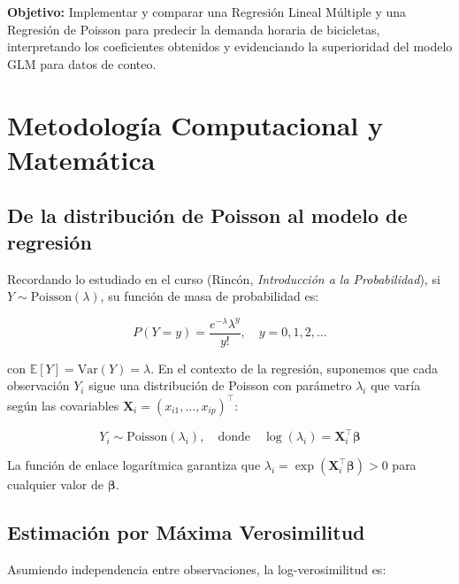 \documentclass[12pt, a4paper]{article}
\begin{document}
	\textbf{Objetivo:} Implementar y comparar una Regresi\'on Lineal M\'ultiple y una
	Regresi\'on de Poisson para predecir la demanda horaria de bicicletas, interpretando
	los coeficientes obtenidos y evidenciando la superioridad del modelo GLM para datos
	de conteo.
	
	\section{Metodolog\'ia Computacional y Matem\'atica}
	
	\subsection{De la distribuci\'on de Poisson al modelo de regresi\'on}
	
	Recordando lo estudiado en el curso (Rinc\'on, \textit{Introducci\'on a la
		Probabilidad}), si $Y \sim \text{Poisson}(\lambda)$, su funci\'on de masa de
	probabilidad es:
	
	\begin{equation}
		P(Y = y) = \frac{e^{-\lambda}\lambda^{y}}{y!}, \quad y = 0, 1, 2, \ldots
		\label{eq:poisson_pmf}
	\end{equation}
	
	con $\mathbb{E}[Y] = \text{Var}(Y) = \lambda$. En el contexto de la regresi\'on,
	suponemos que cada observaci\'on $Y_i$ sigue una distribuci\'on de Poisson con
	par\'ametro $\lambda_i$ que var\'ia seg\'un las covariables
	$\mathbf{X}_i = (x_{i1}, \ldots, x_{ip})^{\top}$:
	
	\begin{equation}
		Y_i \sim \text{Poisson}(\lambda_i), \quad \text{donde} \quad
		\log(\lambda_i) = \mathbf{X}_i^{\top}\boldsymbol{\beta}
		\label{eq:log_link}
	\end{equation}
	
	La funci\'on de enlace logar\'itmica garantiza que
	$\lambda_i = \exp(\mathbf{X}_i^{\top}\boldsymbol{\beta}) > 0$
	para cualquier valor de $\boldsymbol{\beta}$.
	
	\subsection{Estimaci\'on por M\'axima Verosimilitud}
	
	Asumiendo independencia entre observaciones, la log-verosimilitud es:
	
\end{document}
